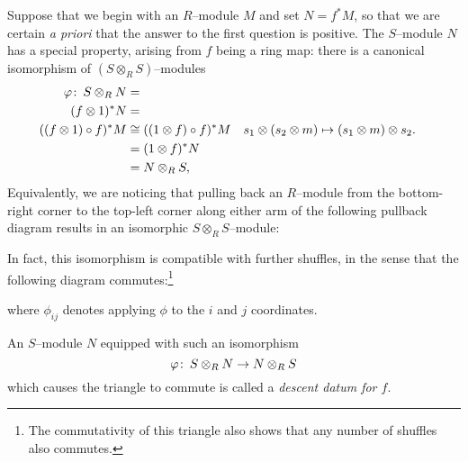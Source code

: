 Suppose that we begin with an \(R\)--module \(M\) and set \(N = f^* M\), so that we are certain \emph{a priori} that the answer to the first question is positive.  The \(S\)--module \(N\) has a special property, arising from \(f\) being a ring map: there is a canonical isomorphism of \((S \otimes_R S)\)--modules
\begin{align*}
\varphi\colon\thinspace S \otimes_R N & = \\
(f \otimes 1)^* N & = \\
((f \otimes 1) \circ f)^* M & \cong ((1 \otimes f) \circ f)^* M & s_1 \otimes (s_2 \otimes m) & \mapsto (s_1 \otimes m) \otimes s_2. \\
& = (1 \otimes f)^* N \\
& = N \otimes_R S,
\end{align*}
Equivalently, we are noticing that pulling back an \(R\)--module from the bottom-right corner to the top-left corner along either arm of the following pullback diagram results in an isomorphic \(S \otimes_R S\)--module:
\begin{center}
\end{center}
In fact, this isomorphism is compatible with further shuffles, in the sense that the following diagram commutes:\footnote{The commutativity of this triangle also shows that any number of shuffles also commutes.}
\begin{center}
\end{center}
where \(\phi_{ij}\) denotes applying \(\phi\) to the \(i\){\th} and \(j\){\th} coordinates.

\begin{definition}
An \(S\)--module \(N\) equipped with such an isomorphism \[\varphi\colon\thinspace S \otimes_R N \to N \otimes_R S\] which causes the triangle to commute is called a \textit{descent datum for \(f\)}.
\end{definition}


